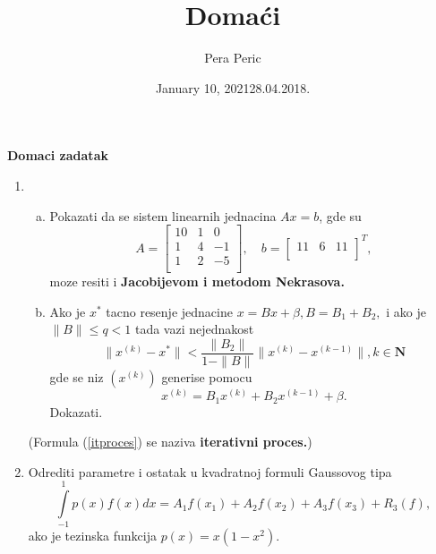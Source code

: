\documentclass[11pt, a4paper, leqno]{article}
\title{Doma\' ci}
\author{Pera Peric}
\date{January 10, 2021}
\begin{document}
    \maketitle
    \thispagestyle{empty}
    \newpage
    \begin{center}
        \textbf{Domaci zadatak}\\
        \medskip
        \date{28.04.2018.}
    \end{center}
    \vskip1cm
    
    \begin{enumerate}
        \item \begin{enumerate}[a)]
            \item Pokazati da se sistem linearnih jednacina $Ax=b$, gde su
            $$
                A = \left[ 
                    \begin{array}{ccc}
                        10 & 1 & 0\\
                        1 & 4 & -1\\
                        1 & 2 & -5\\
                    \end{array}
                \right], \quad b=\left[ 
                    \begin{array}{ccc}
                        11 & 6 & 11\\
                    \end{array}
                 \right]^T,
            $$
            moze resiti i \textbf{Jacobijevom i metodom Nekrasova.}
        \item Ako je $x^*$ tacno resenje jednacine $x=Bx+ \beta, B = B_1 + B_2,$ i ako je $\|B\| \leq q < 1$ tada vazi nejednakost
            $$
                \|x^{(k)}-x^*\| < \frac{\|B_2\|}{1-\|B\|}\|x^{(k)}-x^{(k-1)}\|, k \in \mathbf{N}
            $$
            gde se niz $(x^{(k)})$ generise pomocu
            \begin{equation}
            \label{itproces}
                x^{(k)}=B_1x^{(k)}+B_2x^{(k-1)}+ \beta .
            \end{equation}
            Dokazati.
        \end{enumerate}
        (Formula (\ref{itproces}) se naziva \textbf{iterativni proces.})
        \item Odrediti parametre i ostatak u kvadratnoj formuli Gaussovog tipa
        $$
            \int\limits_{-1}^1{p(x)f(x)dx}=A_1f(x_1)+A_2f(x_2)+A_3f(x_3)+R_3(f),
        $$
        ako je tezinska funkcija $p(x)=x(1-x^2)$.\\

\end{enumerate}
\end{document}
